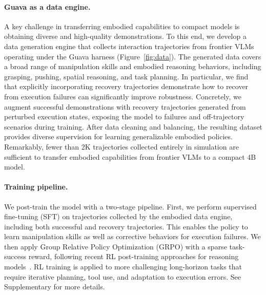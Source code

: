 \vspace{-2mm}
\paragraph{Guava as a data engine.}
A key challenge in transferring embodied capabilities to compact models is obtaining diverse and high-quality demonstrations. 
To this end, we develop a data generation engine that collects interaction trajectories from frontier VLMs operating under the Guava harness (Figure~\ref{fig:data}). 
The generated data covers a broad range of manipulation skills and embodied reasoning behaviors, including grasping, pushing, spatial reasoning, and task planning.
In particular, we find that explicitly incorporating recovery trajectories demonstrate how to recover from execution failures can significantly improve robustness. Concretely, we augment successful demonstrations with recovery trajectories generated from perturbed execution states, exposing the model to failures and off-trajectory scenarios during training.
After data cleaning and balancing, the resulting dataset provides diverse supervision for learning generalizable embodied policies. Remarkably, fewer than 2K trajectories collected entirely in simulation are sufficient to transfer embodied capabilities from frontier VLMs to a compact 4B model.

\vspace{-2mm}
\paragraph{Training pipeline.}
\label{sec}
We post-train the model with a two-stage pipeline. First, we perform supervised fine-tuning (SFT) on trajectories collected by the embodied data engine, including both successful and recovery trajectories. This enables the policy to learn manipulation skills as well as corrective behaviors for execution failures. We then apply Group Relative Policy Optimization (GRPO) with a sparse task-success reward, following recent RL post-training approaches for reasoning models~\citep{shao2024deepseekmathpushinglimitsmathematical, zhou2025r1zerosahamomentvisual}. RL training is applied to more challenging long-horizon tasks that require iterative planning, tool use, and adaptation to execution errors. See Supplementary for more details. 

